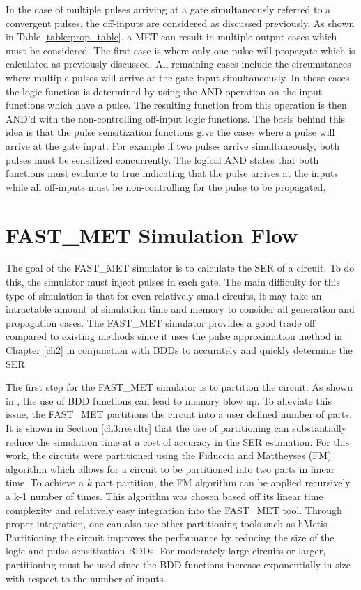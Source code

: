In the case of multiple pulses arriving at a gate simultaneously referred to a convergent pulses, the off-inputs are considered as discussed previously. As shown in Table \ref{table:prop_table}, a MET can result in multiple output cases which must be considered. The first case is where only one pulse will propagate which is calculated as previously discussed. All remaining cases include the circumstances where multiple pulses will arrive at the gate input simultaneously. In these cases, the logic function is determined by using the AND operation on the input functions which have a pulse. The resulting function from this operation is then AND'd with the non-controlling off-input logic functions. The basis behind this idea is that the pulse sensitization functions give the cases where a pulse will arrive at the gate input. For example if two pulses arrive simultaneously, both pulses must be sensitized concurrently. The logical AND states that both functions must evaluate to true indicating that the pulse arrives at the inputs while all off-inputs must be non-controlling for the pulse to be propagated.

\section{FAST\_MET Simulation Flow}

The goal of the FAST\_MET simulator is to calculate the SER of a circuit. To do this, the simulator must inject pulses in each gate. The main difficulty for this type of simulation is that for even relatively small circuits, it may take an intractable amount of simulation time and memory to consider all generation and propagation cases. The FAST\_MET simulator provides a good trade off compared to existing methods since it uses the pulse approximation method in Chapter \ref{ch2} in conjunction with BDDs to accurately and quickly determine the SER.

The first step for the FAST\_MET simulator is to partition the circuit. As shown in \cite{FASER,METSys}, the use of BDD functions can lead to memory blow up. To alleviate this issue, the FAST\_MET partitions the circuit into a user defined number of parts. It is shown in Section \ref{ch3:results} that the use of partitioning can substantially reduce the simulation time at a cost of accuracy in the SER estimation. For this work, the circuits were partitioned using the Fiduccia and Mattheyses (FM) algorithm \cite{Fiduccia1982} which allows for a circuit to be partitioned into two parts in linear time. To achieve a $k$ part partition, the FM algorithm can be applied recursively a k-1 number of times. This algorithm was chosen based off its linear time complexity and relatively easy integration into the FAST\_MET tool. Through proper integration, one can also use other partitioning tools such as hMetis \cite{hMetis}. Partitioning the circuit improves the performance by reducing the size of the logic and pulse sensitization BDDs. For moderately large circuits or larger, partitioning must be used since the BDD functions increase exponentially in size with respect to the number of inputs.

